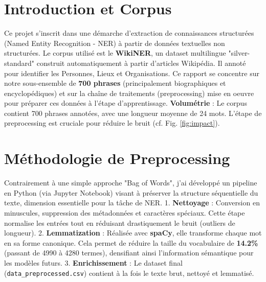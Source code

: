 \documentclass[10pt,a4paper,twocolumn]{article}
\begin{document}



\section*{Introduction et Corpus}
Ce projet s'inscrit dans une démarche d'extraction de connaissances structurées (Named Entity Recognition - NER) à partir de données textuelles non structurées. Le corpus utilisé est le \textbf{WikiNER}, un dataset multilingue "silver-standard" construit automatiquement à partir d'articles Wikipédia.
Il annoté pour identifier les Personnes, Lieux et Organisations. 
Ce rapport se concentre sur notre sous-ensemble de \textbf{700 phrases} (principalement biographiques et encyclopédiques) et sur la chaîne de traitements (preprocessing) mise en oeuvre pour préparer ces données à l'étape d'apprentissage.
\textbf{Volumétrie} : Le corpus contient 700 phrases annotées, avec une longueur moyenne de 24 mots. L'étape de preprocessing est cruciale pour réduire le bruit (cf. Fig. \ref{fig:impact}).

\section*{Méthodologie de Preprocessing}
Contrairement à une simple approche "Bag of Words", j'ai développé un pipeline en Python (via Jupyter Notebook) visant à préserver la structure séquentielle du texte, dimension essentielle pour la tâche de NER.
1. \textbf{Nettoyage} : Conversion en minuscules, suppression des métadonnées et caractères spéciaux. Cette étape normalise les entrées tout en réduisant drastiquement le bruit (outliers de longueur).
2. \textbf{Lemmatization} : Réalisée avec \textbf{spaCy}, elle transforme chaque mot en sa forme canonique. Cela permet de réduire la taille du vocabulaire de \textbf{14.2\%} (passant de 4990 à 4280 termes), densifiant ainsi l'information sémantique pour les modèles futurs.
3. \textbf{Enrichissement} : Le dataset final (\texttt{data\_preprocessed.csv}) contient à la fois le texte brut, nettoyé et lemmatisé.
\end{document}
